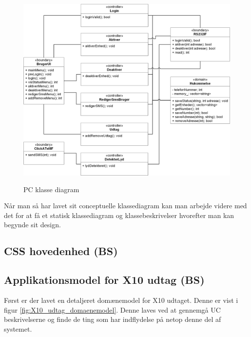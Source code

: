 \clearpage
\begin{figure}[htbp] \centering
{\includegraphics[width=\textwidth]{billeder/uml/PC_class}}
\caption{PC klasse diagram}
\label{lab: PC klasse diagram}
\end{figure}

Når man så har lavet sit conceptuelle klassediagram kan man arbejde videre med det for at få et statisk klassediagram og klassebeskrivelser hvorefter man kan begynde sit design.

\subsection{CSS hovedenhed (BS)}

\subsection{Applikationsmodel for X10 udtag (BS)}
Først er der lavet en detaljeret domænemodel for X10 udtaget. Denne er vist i figur \ref{fig:X10_udtag_domaenemodel}. Denne laves ved at gennemgå UC beskrivelserne og finde de ting som har indflydelse på netop denne del af systemet.

